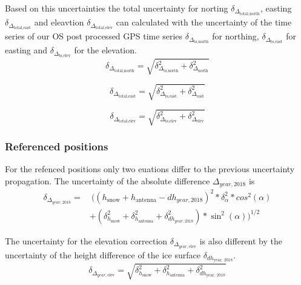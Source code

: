 Based on this uncertainties the total uncertainty for norting $\delta_{\Delta_{\text{total,north}}}$, easting $\delta_{\Delta_{\text{total,east}}}$ and eleavtion $\delta_{\Delta_{\text{total,elev}}}$ can calculated with the uncertainty of the time series of our OS post processed GPS time series $\delta_{\Delta_{\text{ts,north}}}$ for northing, $\delta_{\Delta_{\text{ts,east}}}$ for easting and $\delta_{\Delta_{\text{ts,elev}}}$ for the elevation.
\begin{equation}
	\delta_{\Delta_{\text{total,north}}} = \sqrt{\delta_{\Delta_{\text{ts,north}}}^2 + \delta_{\Delta_{\text{north}}}^2}
	\label{GPS:eq:errnorth}
\end{equation}

\begin{equation}
	\delta_{\Delta_{\text{total,east}}} = \sqrt{\delta_{\Delta_{\text{ts,east}}}^2 + \delta_{\Delta_{\text{east}}}^2}
	\label{GPS:eq:erreast}
\end{equation}

\begin{equation}
	\delta_{\Delta_{\text{total,elev}}} = \sqrt{\delta_{\Delta_{\text{ts,elev}}}^2 +\delta_{\Delta_{\text{elev}}}^2}
	\label{GPS:eq:errnelev}
\end{equation}

\subsubsection*{Referenced positions}
For the refenced positions only two euations differ to the previous uncertainty propagation. 
The uncertainty of the absolute difference $\Delta_{year,2018}$ is
\begin{equation}
\begin{split}
\delta_{\Delta_{year,2018}} = & 
\ ((h_{\text{snow}} + h_{\text{antenna}} - dh_{year,2018})^2 * \delta_{\alpha}^2 * cos^2(\alpha)\\
&+ (\delta_{h_{\text{snow}}}^2 + \delta_{h_{\text{antenna}}}^2 + \delta_{dh_{year,2018}}^2) * \sin^2(\alpha))^{1/2}
\end{split}
\end{equation}

The uncertainty for the elevation correction $\delta_{\Delta_{year, \text{elev}}}$ is also different by the uncertainty of the height difference of the ice surface $\delta_{dh_{\text{year, 2018}}}$.
\begin{equation}
	\delta_{\Delta_{year, \text{elev}}} = \sqrt{\delta_{h_{\text{snow}}}^2 + \delta_{h_{\text{antenna}}}^2 + \delta_{dh_{\text{year, 2018}}}^2}
\end{equation}

